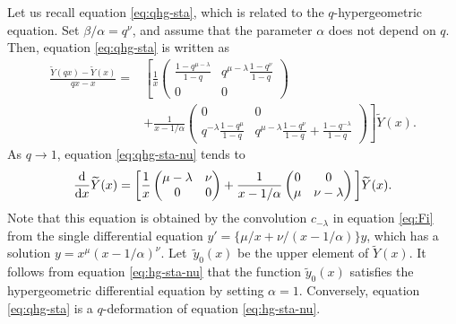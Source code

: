 \documentclass[pdftex]{sigma}
\numberwithin{equation}{section}
\theoremstyle{definition}
\begin{document}
Let us recall equation \eqref{eq:qhg-sta}, which is related to the $q$-hypergeometric equation.
Set $\beta/\alpha = q^{\nu}$, and assume that the parameter $\alpha $ does not depend on $q$.
Then, equation \eqref{eq:qhg-sta} is written as
\begin{align}
\frac{\widetilde{Y}(qx) - \widetilde{Y}(x)}{qx-x}
={}& \left[ \frac{1}{x} \begin{pmatrix}
 \displaystyle \frac{1 - q^{\mu - \lambda}}{1-q} & \displaystyle q^{\mu - \lambda}\frac{1 - q^{\nu}}{1-q} \\
 0 & 0
 \end{pmatrix} \nonumber\right. \\
& \left.+ \frac{1}{x-1/\alpha} \begin{pmatrix}
 0 & 0 \\
 \displaystyle q^{-\lambda} \frac{1 - q^{\mu}}{1-q} & \displaystyle q^{\mu - \lambda}\frac{1 - q^{\nu}}{1-q} + \frac{1 -q^{-\lambda}}{1-q}
 \end{pmatrix}
\right] \widetilde{Y}(x). \label{eq:qhg-sta-nu}
\end{align}
As $q\to 1$, equation \eqref{eq:qhg-sta-nu} tends to
\begin{equation} \label{eq:hg-sta-nu}
\frac{{\rm d}}{{\rm d}x} \widetilde{Y}(x)
= \bigg[ \frac{1}{x} \begin{pmatrix}
 \mu - \lambda & \nu \\
 0 & 0
 \end{pmatrix}
+ \frac{1}{x-1/\alpha} \begin{pmatrix}
 0 & 0 \\
 \mu & \nu - \lambda
 \end{pmatrix}
\bigg] \widetilde{Y}(x).
\end{equation}
Note that this equation is obtained by the convolution $c_{-\lambda }$ in equation \eqref{eq:Fi} from the single differential equation $y'= \{ \mu /x +\nu /(x-1/\alpha ) \} y $, which has a solution $y=x^{\mu } (x-1/\alpha )^{\nu }$.
Let~$\widetilde{y}_0(x) $ be the upper element of $\widetilde{Y}(x) $.
It follows from equation \eqref{eq:hg-sta-nu} that the function $\widetilde{y}_0(x) $ satisfies the hypergeometric differential equation by setting $\alpha =1$.
Conversely, equation \eqref{eq:qhg-sta} is a $q$-deformation of equation \eqref{eq:hg-sta-nu}.
\end{document}
